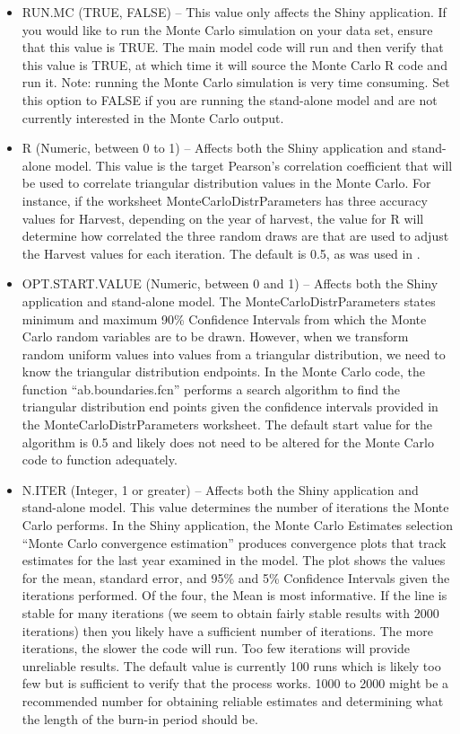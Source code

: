 \documentclass[
]{book}
\begin{document}
\begin{itemize}
\item
  RUN.MC (TRUE, FALSE) -- This value only affects the Shiny application. If you would like to run the Monte Carlo simulation on your data set, ensure that this value is TRUE. The main model code will run and then verify that this value is TRUE, at which time it will source the Monte Carlo R code and run it. Note: running the Monte Carlo simulation is very time consuming. Set this option to FALSE if you are running the stand-alone model and are not currently interested in the Monte Carlo output.
\item
  R (Numeric, between 0 to 1) -- Affects both the Shiny application and stand-alone model. This value is the target Pearson's correlation coefficient that will be used to correlate triangular distribution values in the Monte Carlo. For instance, if the worksheet MonteCarloDistrParameters has three accuracy values for Harvest, depending on the year of harvest, the value for R will determine how correlated the three random draws are that are used to adjust the Harvest values for each iteration. The default is 0.5, as was used in \citet{stockmann2012}.
\item
  OPT.START.VALUE (Numeric, between 0 and 1) -- Affects both the Shiny application and stand-alone model. The MonteCarloDistrParameters states minimum and maximum 90\% Confidence Intervals from which the Monte Carlo random variables are to be drawn. However, when we transform random uniform values into values from a triangular distribution, we need to know the triangular distribution endpoints. In the Monte Carlo code, the function ``ab.boundaries.fcn'' performs a search algorithm to find the triangular distribution end points given the confidence intervals provided in the MonteCarloDistrParameters worksheet. The default start value for the algorithm is 0.5 and likely does not need to be altered for the Monte Carlo code to function adequately.
\item
  N.ITER (Integer, 1 or greater) -- Affects both the Shiny application and stand-alone model. This value determines the number of iterations the Monte Carlo performs. In the Shiny application, the Monte Carlo Estimates selection ``Monte Carlo convergence estimation'' produces convergence plots that track estimates for the last year examined in the model. The plot shows the values for the mean, standard error, and 95\% and 5\% Confidence Intervals given the iterations performed. Of the four, the Mean is most informative. If the line is stable for many iterations (we seem to obtain fairly stable results with 2000 iterations) then you likely have a sufficient number of iterations. The more iterations, the slower the code will run. Too few iterations will provide unreliable results. The default value is currently 100 runs which is likely too few but is sufficient to verify that the process works. 1000 to 2000 might be a recommended number for obtaining reliable estimates and determining what the length of the burn-in period should be.

\end{itemize}
\end{document}
